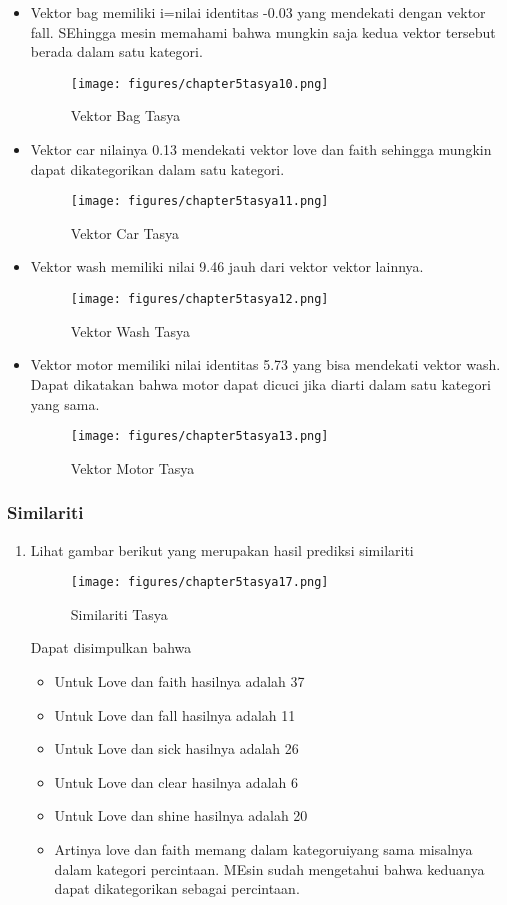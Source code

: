 \begin{itemize}
\item Vektor bag memiliki i=nilai identitas -0.03 yang mendekati dengan vektor fall. SEhingga mesin memahami bahwa mungkin saja kedua vektor tersebut berada dalam satu kategori.
\begin{figure}[ht]
\centering
\texttt{[image: figures/chapter5tasya10.png]}
\caption{Vektor Bag Tasya}
\label{Praktek}
\end{figure}


\item Vektor car nilainya 0.13 mendekati vektor love dan faith sehingga mungkin dapat dikategorikan dalam satu kategori.
\begin{figure}[ht]
\centering
\texttt{[image: figures/chapter5tasya11.png]}
\caption{Vektor Car Tasya}
\label{Praktek}
\end{figure}


\item Vektor wash memiliki nilai 9.46 jauh dari vektor vektor lainnya.
\begin{figure}[ht]
\centering
\texttt{[image: figures/chapter5tasya12.png]}
\caption{Vektor Wash Tasya}
\label{Praktek}
\end{figure}


\item Vektor motor memiliki nilai identitas 5.73 yang bisa mendekati vektor wash. Dapat dikatakan bahwa motor dapat dicuci jika diarti dalam satu kategori yang sama.
\begin{figure}[ht]
\centering
\texttt{[image: figures/chapter5tasya13.png]}
\caption{Vektor Motor Tasya}
\label{Praktek}
\end{figure}
\end{itemize}

\subsubsection{Similariti}
\begin{enumerate}
\item Lihat gambar berikut yang merupakan hasil prediksi similariti
\begin{figure}[ht]
\centering
\texttt{[image: figures/chapter5tasya17.png]}
\caption{Similariti Tasya}
\label{Praktek}
\end{figure}

Dapat disimpulkan bahwa
\begin{itemize}
\item Untuk Love dan faith hasilnya adalah 37%
\item Untuk Love dan fall hasilnya adalah 11%
\item Untuk Love dan sick hasilnya adalah 26%
\item Untuk Love dan clear hasilnya adalah 6%
\item Untuk Love dan shine hasilnya adalah 20%
\item Artinya love dan faith memang dalam kategoruiyang sama misalnya dalam kategori percintaan. MEsin sudah mengetahui bahwa keduanya dapat dikategorikan sebagai percintaan.
\end{itemize}
\end{enumerate}

